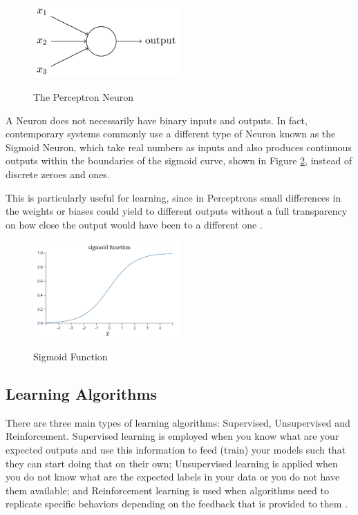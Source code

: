 \begin{figure}[H]
	\centering
	\caption[The Perceptron Neuron]{The Perceptron Neuron}
    \includegraphics[width=0.5\textwidth]{./images/perceptron.png}
	\label{fig:perceptron}
\end{figure}

A Neuron does not necessarily have binary inputs and outputs. In fact,
contemporary systems commonly use a different type of Neuron known as the
Sigmoid Neuron, which take real numbers as inputs and also produces continuous
outputs within the boundaries of the sigmoid curve, shown in Figure
\ref{fig:sigmoid}, instead of discrete zeroes and ones.

This is particularly useful for learning, since in Perceptrons small differences in the 
weights or biases could yield to different outputs without a full transparency 
on how close the output would have been to a different one \cite{Nielsen2015}.

\begin{figure}[H]
	\centering
	\caption[Sigmoid Function]{Sigmoid Function}
    \includegraphics[width=0.5\textwidth]{./images/sigmoid-function.png}
	\label{fig:sigmoid}
\end{figure}

\subsection{Learning Algorithms}

There are three main types of learning algorithms: Supervised, Unsupervised and Reinforcement.
Supervised learning is employed when you know what are your expected outputs and use this
information to feed (train) your models such that they can start doing that on their own; 
Unsupervised learning is applied when you do not know what are the expected labels 
in your data or you do not have them available; and Reinforcement learning is used when
algorithms need to replicate specific behaviors depending on the feedback that is
provided to them \cite{CourseraML}. 

